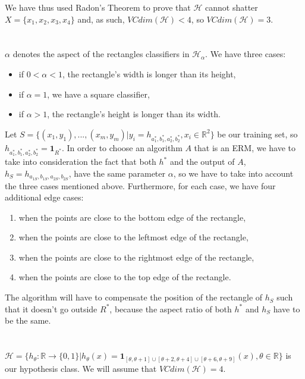 \documentclass{article}
\begin{document}
We have thus used Radon's Theorem to prove that $\mathcal{H}$ cannot shatter $X=\{x_1,x_2,x_3,x_4\}$ and, as such, $VCdim(\mathcal{H}) < 4$, so $VCdim(\mathcal{H})=3$.
\section{}
\subsection{}
$\alpha$ denotes the aspect of the rectangles classifiers in $\mathcal{H}_\alpha$. We have three cases:
\begin{itemize}
	\item if $0<\alpha<1$, the rectangle's width is longer than its height,
	\item if $\alpha = 1$, we have a square classifier,
	\item if $\alpha > 1$, the rectangle's height is longer than its width.
\end{itemize}

Let $S=\{ (x_1,y_1),..., (x_m,y_m) | y_i = h_{a_1^*,b_1^*,a_2^*,b_2^*}, x_i\in\mathbb{R}^2 \}$ be our training set, so $h_{a_1^*,b_1^*,a_2^*,b_2^*}=\mathbf{1}_{R^*}$. In order to choose an algorithm $A$ that is an ERM, we have to take into consideration the fact that both $h^*$ and the output of $A$, $h_S=h_{a_{1S},b_{1S},a_{2S},b_{2S}}$, have the same parameter $\alpha$, so we have to take into account the three cases mentioned above. Furthermore, for each case, we have four additional edge cases: 
\begin{enumerate}
	\item when the points are close to the bottom edge of the rectangle,
	\item when the points are close to the leftmost edge of the rectangle,
	\item when the points are close to the rightmost edge of the rectangle,
	\item when the points are close to the top edge of the rectangle.
\end{enumerate}
The algorithm will have to compensate the position of the rectangle of $h_S$ such that it doesn't go outside $R^*$, because the aspect ratio of both $h^*$ and $h_S$ have to be the same.
\section{}
$
\mathcal{H}=\{h_\theta:\mathbb{R}\rightarrow\{0,1\}|h_\theta(x)=\mathbf{1}_{[\theta,\theta +1]\cup[\theta +2,\theta +4]\cup[\theta +6,\theta +9]}(x),\theta\in\mathbb{R}\}
$ is our hypothesis class. We will assume that $VCdim(\mathcal{H})=4$.
\end{document}
